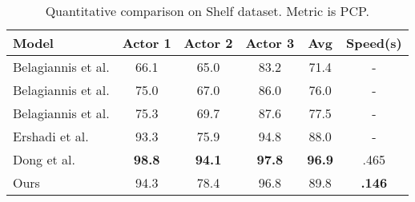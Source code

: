 \documentclass[a4paper,conference]{IEEEtran}
\begin{document}
\begin{table}[!t]
\renewcommand{\arraystretch}{1}
\setlength{\tabcolsep}{3pt}
\caption{Methods comparison on Panoptic D2D test set. MPJPE and PCP metrics for scenes with single person and multiple people.}
\label{tab:d2d}
\centering
{}
 \end{table}
 \begin{table}[!t]
\renewcommand{\arraystretch}{1}
\setlength{\tabcolsep}{3pt}
\caption{Quantitative comparison on Shelf dataset. Metric is PCP.}
\label{tab:shelf}
\centering
\begin{tabular}{l|c c c|c|c}
\hline
 Model & Actor 1 & Actor 2 & Actor 3 & Avg & Speed(s) \\
 \hline
 Belagiannis et al. \cite{belagiannis20143d} & 66.1 & 65.0 & 83.2 & 71.4 & -\\
 Belagiannis et al. \cite{belagiannis2014multiple} & 75.0 & 67.0 & 86.0 & 76.0 & -\\
 Belagiannis et al. \cite{belagiannis20153d} & 75.3 & 69.7 & 87.6 & 77.5 & - \\
 Ershadi et al. \cite{ershadi2018multiple} & 93.3 & 75.9 & 94.8 & 88.0 & - \\
  Dong et al. \cite{dong2019fast} & \textbf{98.8} & \textbf{94.1} & \textbf{97.8} & \textbf{96.9} & .465 \\
 Ours & 94.3 & 78.4 & 96.8 & 89.8 & \textbf{.146}\\
 \hline
 \end{tabular}
 \end{table}
\end{document}
